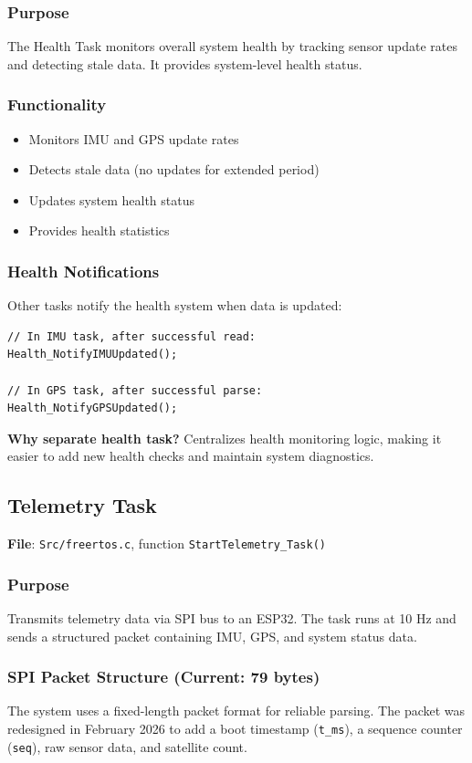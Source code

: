\documentclass[11pt,a4paper]{article}
\begin{document}
\subsubsection{Purpose}
The Health Task monitors overall system health by tracking sensor update rates and detecting stale data. It provides system-level health status.

\subsubsection{Functionality}
\begin{itemize}
    \item Monitors IMU and GPS update rates
    \item Detects stale data (no updates for extended period)
    \item Updates system health status
    \item Provides health statistics
\end{itemize}

\subsubsection{Health Notifications}
Other tasks notify the health system when data is updated:
\begin{lstlisting}[caption=Health Notifications, label=lst:healthnotify]
// In IMU task, after successful read:
Health_NotifyIMUUpdated();

// In GPS task, after successful parse:
Health_NotifyGPSUpdated();
\end{lstlisting}

\textbf{Why separate health task?} Centralizes health monitoring logic, making it easier to add new health checks and maintain system diagnostics.

\subsection{Telemetry Task}
\textbf{File}: \texttt{Src/freertos.c}, function \texttt{StartTelemetry\_Task()}

\subsubsection{Purpose}
Transmits telemetry data via SPI bus to an ESP32. The task runs at 10 Hz and sends a structured packet containing IMU, GPS, and system status data.

\subsubsection{SPI Packet Structure (Current: 79 bytes)}
The system uses a fixed-length packet format for reliable parsing.
The packet was redesigned in February 2026 to add a boot timestamp (\texttt{t\_ms}),
a sequence counter (\texttt{seq}), raw sensor data, and satellite count.
\end{document}
